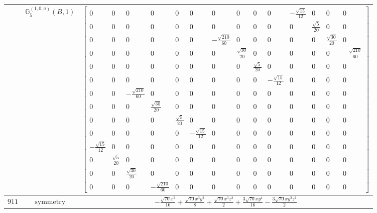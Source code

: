 \documentclass[fleqn,8pt,landscape]{jsarticle}
\begin{document}
\begin{longtable}{ccc}
$  $ & $ \mathbb{G}_{5}^{(1,0;a)}(B,1) $ & $ \begin{bmatrix} 0 & 0 & 0 & 0 & 0 & 0 & 0 & 0 & 0 & 0 & - \frac{\sqrt{15}}{12} & 0 & 0 & 0 \\ 0 & 0 & 0 & 0 & 0 & 0 & 0 & 0 & 0 & 0 & 0 & \frac{\sqrt{5}}{20} & 0 & 0 \\ 0 & 0 & 0 & 0 & 0 & 0 & - \frac{\sqrt{210}}{60} & 0 & 0 & 0 & 0 & 0 & \frac{\sqrt{30}}{20} & 0 \\ 0 & 0 & 0 & 0 & 0 & 0 & 0 & \frac{\sqrt{30}}{20} & 0 & 0 & 0 & 0 & 0 & - \frac{\sqrt{210}}{60} \\ 0 & 0 & 0 & 0 & 0 & 0 & 0 & 0 & \frac{\sqrt{5}}{20} & 0 & 0 & 0 & 0 & 0 \\ 0 & 0 & 0 & 0 & 0 & 0 & 0 & 0 & 0 & - \frac{\sqrt{15}}{12} & 0 & 0 & 0 & 0 \\ 0 & 0 & - \frac{\sqrt{210}}{60} & 0 & 0 & 0 & 0 & 0 & 0 & 0 & 0 & 0 & 0 & 0 \\ 0 & 0 & 0 & \frac{\sqrt{30}}{20} & 0 & 0 & 0 & 0 & 0 & 0 & 0 & 0 & 0 & 0 \\ 0 & 0 & 0 & 0 & \frac{\sqrt{5}}{20} & 0 & 0 & 0 & 0 & 0 & 0 & 0 & 0 & 0 \\ 0 & 0 & 0 & 0 & 0 & - \frac{\sqrt{15}}{12} & 0 & 0 & 0 & 0 & 0 & 0 & 0 & 0 \\ - \frac{\sqrt{15}}{12} & 0 & 0 & 0 & 0 & 0 & 0 & 0 & 0 & 0 & 0 & 0 & 0 & 0 \\ 0 & \frac{\sqrt{5}}{20} & 0 & 0 & 0 & 0 & 0 & 0 & 0 & 0 & 0 & 0 & 0 & 0 \\ 0 & 0 & \frac{\sqrt{30}}{20} & 0 & 0 & 0 & 0 & 0 & 0 & 0 & 0 & 0 & 0 & 0 \\ 0 & 0 & 0 & - \frac{\sqrt{210}}{60} & 0 & 0 & 0 & 0 & 0 & 0 & 0 & 0 & 0 & 0 \end{bmatrix} $ \\ \hline
$ 911 $ & $ \text{symmetry} $ & $ - \frac{\sqrt{70} x^{5}}{16} + \frac{\sqrt{70} x^{3} y^{2}}{8} + \frac{\sqrt{70} x^{3} z^{2}}{2} + \frac{3 \sqrt{70} x y^{4}}{16} - \frac{3 \sqrt{70} x y^{2} z^{2}}{2} $ \\

\end{longtable}
\end{document}

